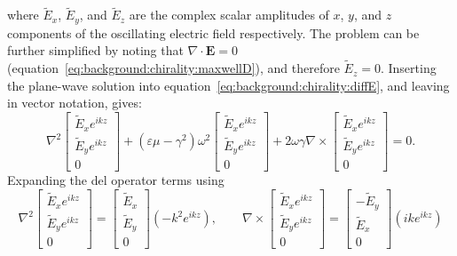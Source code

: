where $\tilde E_x$, $\tilde E_y$, and $\tilde E_z$ are the complex scalar amplitudes of $x$, $y$, and $z$ components of the oscillating electric field respectively. The problem can be further simplified by noting that $\nabla \cdot \mathbf{E} = 0$ (equation~\ref{eq:background:chirality:maxwellD}), and therefore $\tilde E_z = 0$. Inserting the plane-wave solution into equation~\ref{eq:background:chirality:diffE}, and leaving in vector notation, gives:
\begin{equation}\label{eq:background:chirality:diffEvec}
    \nabla^2 \begin{bmatrix}\tilde E_x e^{i k z}\\ \tilde E_y e^{i k z} \\0 \end{bmatrix}+ (\varepsilon \mu - \gamma^2)\omega^2 \begin{bmatrix}\tilde E_x e^{i k z}\\ \tilde E_y e^{i k z} \\0 \end{bmatrix} + 2 \omega \gamma \nabla \times \begin{bmatrix}\tilde E_x e^{i k z}\\ \tilde E_y e^{i k z} \\0 \end{bmatrix} = 0.
\end{equation}
Expanding the del operator terms using
\begin{equation}
    \nabla^2 
    \begin{bmatrix}
        \tilde E_x e^{i k z}\\ 
        \tilde E_y e^{i k z} \\
        0 
    \end{bmatrix} 
    = 
    \begin{bmatrix} 
        \tilde E_x \\ 
        \tilde E_y \\ 
        0 
    \end{bmatrix} 
    (-k^2 e^{i k z}), \qquad
    \nabla \times
    \begin{bmatrix}
        \tilde E_x e^{i k z}\\ 
        \tilde E_y e^{i k z} \\
        0 
    \end{bmatrix} 
    = 
    \begin{bmatrix} 
        -\tilde E_y \\ 
        \tilde E_x \\ 
        0 
    \end{bmatrix} 
    (i k e^{i k z}) 
\end{equation}

